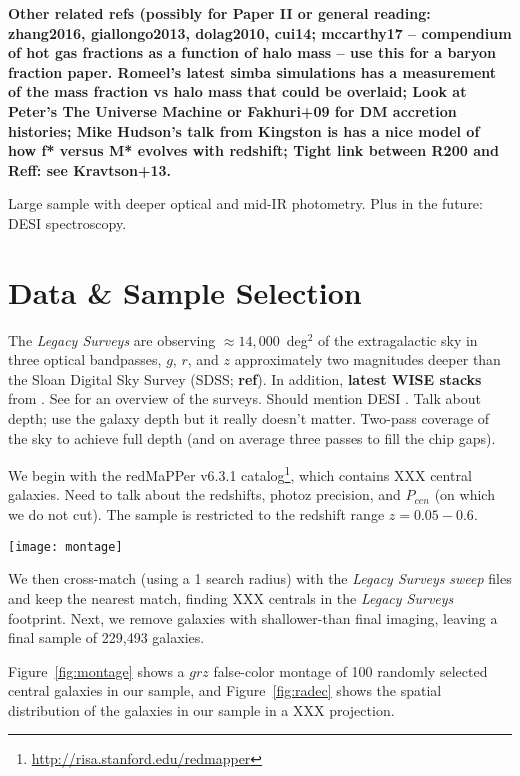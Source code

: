 \documentclass[twocolumn]{aastex62}
\newcommand\redmapper{redMaPPer}
\newcommand\LS{\textit{Legacy Surveys}}
\begin{document}
\vspace{1cm}
{\bf Other related refs (possibly for Paper II or general reading:
zhang2016, giallongo2013, dolag2010, cui14;   mccarthy17 -- compendium of hot gas fractions as a function of halo mass -- use this for a baryon fraction paper.  Romeel's latest simba simulations has a measurement of the mass fraction vs halo mass that could be overlaid;  Look at Peter's The Universe Machine or Fakhuri+09 for DM accretion histories;  Mike Hudson's talk from Kingston is has a nice model of how f* versus M* evolves with redshift;  Tight link between R200 and Reff: see Kravtson+13.}


Large sample with deeper optical and mid-IR photometry.  Plus in the future: DESI spectroscopy.


\section{Data \& Sample Selection}\label{sec:sample}

The \LS{} are observing $\approx14,000$~deg$^{2}$ of the extragalactic sky in three optical bandpasses, $g$, $r$, and $z$ approximately two magnitudes deeper than the Sloan Digital Sky Survey (SDSS; {\bf ref}).  In addition, {\bf latest WISE stacks} from \citet{meisner18a}.  See \citet{dey18a} for an overview of the surveys.  Should mention DESI \citep{desi-collaboration16a, desi-collaboration16b}.  Talk about depth; use the galaxy depth but it really doesn't matter.  Two-pass coverage of the sky to achieve full depth (and on average three passes to fill the chip gaps). 

We begin with the \redmapper{} v6.3.1 catalog\footnote{\url{http://risa.stanford.edu/redmapper}}, which contains XXX central galaxies.  Need to talk about the redshifts, photoz precision, and $P_{cen}$ (on which we do not cut).  The sample is restricted to the redshift range $z=0.05-0.6$.

\begin{figure*}[!ht]
\centering\texttt{[image: montage]}
\caption{Montage\label{fig:montage}}
\end{figure*}

We then cross-match (using a 1\arcsec{} search radius) with the \LS{} \emph{sweep} files and keep the nearest match, finding XXX centrals in the \LS{} footprint.  Next, we remove galaxies with shallower-than final imaging, leaving a final sample of 229,493 galaxies.

Figure~\ref{fig:montage} shows a $grz$ false-color montage of 100 randomly selected central galaxies in our sample, and Figure~\ref{fig:radec} shows the spatial distribution of the galaxies in our sample in a XXX projection.
\end{document}
